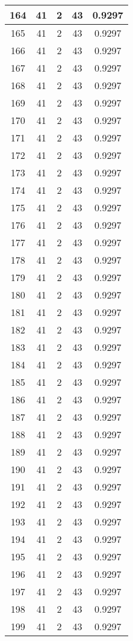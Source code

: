 \documentclass[letterpaper, 12pt]{article}
\begin{document}
\begin{longtable}{|c|c|c|c|c|}
\hline
164 & 41 & 2 & 43 & 0.9297 \\
\hline
165 & 41 & 2 & 43 & 0.9297 \\
\hline
166 & 41 & 2 & 43 & 0.9297 \\
\hline
167 & 41 & 2 & 43 & 0.9297 \\
\hline
168 & 41 & 2 & 43 & 0.9297 \\
\hline
169 & 41 & 2 & 43 & 0.9297 \\
\hline
170 & 41 & 2 & 43 & 0.9297 \\
\hline
171 & 41 & 2 & 43 & 0.9297 \\
\hline
172 & 41 & 2 & 43 & 0.9297 \\
\hline
173 & 41 & 2 & 43 & 0.9297 \\
\hline
174 & 41 & 2 & 43 & 0.9297 \\
\hline
175 & 41 & 2 & 43 & 0.9297 \\
\hline
176 & 41 & 2 & 43 & 0.9297 \\
\hline
177 & 41 & 2 & 43 & 0.9297 \\
\hline
178 & 41 & 2 & 43 & 0.9297 \\
\hline
179 & 41 & 2 & 43 & 0.9297 \\
\hline
180 & 41 & 2 & 43 & 0.9297 \\
\hline
181 & 41 & 2 & 43 & 0.9297 \\
\hline
182 & 41 & 2 & 43 & 0.9297 \\
\hline
183 & 41 & 2 & 43 & 0.9297 \\
\hline
184 & 41 & 2 & 43 & 0.9297 \\
\hline
185 & 41 & 2 & 43 & 0.9297 \\
\hline
186 & 41 & 2 & 43 & 0.9297 \\
\hline
187 & 41 & 2 & 43 & 0.9297 \\
\hline
188 & 41 & 2 & 43 & 0.9297 \\
\hline
189 & 41 & 2 & 43 & 0.9297 \\
\hline
190 & 41 & 2 & 43 & 0.9297 \\
\hline
191 & 41 & 2 & 43 & 0.9297 \\
\hline
192 & 41 & 2 & 43 & 0.9297 \\
\hline
193 & 41 & 2 & 43 & 0.9297 \\
\hline
194 & 41 & 2 & 43 & 0.9297 \\
\hline
195 & 41 & 2 & 43 & 0.9297 \\
\hline
196 & 41 & 2 & 43 & 0.9297 \\
\hline
197 & 41 & 2 & 43 & 0.9297 \\
\hline
198 & 41 & 2 & 43 & 0.9297 \\
\hline
199 & 41 & 2 & 43 & 0.9297 \\
\hline
\end{longtable}
\end{document}
